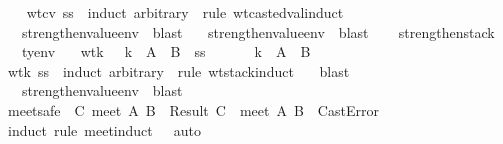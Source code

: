 \begin{isabellebody}
\isadelimproof
\ \ \endisadelimproof
\isatagproof
{}\isamarkupfalse \ wtcv\ ss\ \isamarkupfalse \ {\isacharparenleft}induct\ arbitrary{\isacharcolon}\ {\isasymSigma}{\isacharprime}\ rule{\isacharcolon}\ wt{\isacharunderscore}casted{\isacharunderscore}val{\isachardot}induct{\isacharparenright}\isanewline
\ \ \isamarkupfalse \ strengthen{\isacharunderscore}value{\isacharunderscore}env\ \isamarkupfalse \ blast\isanewline
\ \ \isamarkupfalse \ strengthen{\isacharunderscore}value{\isacharunderscore}env\ \isamarkupfalse \ blast\isanewline
\ \ \isamarkupfalse \endisatagproof
{\isafoldproof}\isadelimproof
\isanewline
\endisadelimproof
\isanewline
{}\isamarkupfalse \ strengthen{\isacharunderscore}stack{\isacharcolon}\isanewline
\ \ \ {\isasymSigma}{\isacharcolon}{\isacharcolon}ty{\isacharunderscore}env\isanewline
\ \ \ wtk{\isacharcolon}\ {\isachardoublequoteopen}{\isasymSigma}\ {\isasymturnstile}\ k\ {\isacharcolon}\ A\ {\isasymRightarrow}\ B{\isachardoublequoteclose}\ \ ss{\isacharcolon}\ {\isachardoublequoteopen}{\isasymSigma}{\isacharprime}\ {\isasymsqsubseteq}\ {\isasymSigma}{\isachardoublequoteclose}\ \ {\isachardoublequoteopen}{\isasymSigma}{\isacharprime}\ {\isasymturnstile}\ k\ {\isacharcolon}\ A\ {\isasymRightarrow}\ B{\isachardoublequoteclose}\isanewline
\isadelimproof
\ \ \endisadelimproof
\isatagproof
{}\isamarkupfalse \ wtk\ ss\ \isamarkupfalse \ {\isacharparenleft}induct\ arbitrary{\isacharcolon}\ {\isasymSigma}{\isacharprime}\ rule{\isacharcolon}\ wt{\isacharunderscore}stack{\isachardot}induct{\isacharparenright}\isanewline
\ \ \isamarkupfalse \ blast\isanewline
\ \ \isamarkupfalse \ strengthen{\isacharunderscore}value{\isacharunderscore}env\ \isamarkupfalse \ blast\ \isamarkupfalse \endisatagproof
{\isafoldproof}\isadelimproof
\isanewline
\endisadelimproof
\isanewline
{}\isamarkupfalse \ meet{\isacharunderscore}safe{\isacharcolon}\ {\isachardoublequoteopen}{\isacharparenleft}{\isacharparenleft}{\isasymexists}\ C{\isachardot}\ meet\ A\ B\ {\isacharequal}\ Result\ C{\isacharparenright}\ {\isasymor}\ meet\ A\ B\ {\isacharequal}\ CastError{\isacharparenright}{\isachardoublequoteclose}\isanewline
\isadelimproof
\ \ \endisadelimproof
\isatagproof
{}\isamarkupfalse \ {\isacharparenleft}induct\ rule{\isacharcolon}\ meet{\isachardot}induct\ {\isacharparenright}\ \isamarkupfalse \ auto\endisatagproof

\end{isabellebody}
